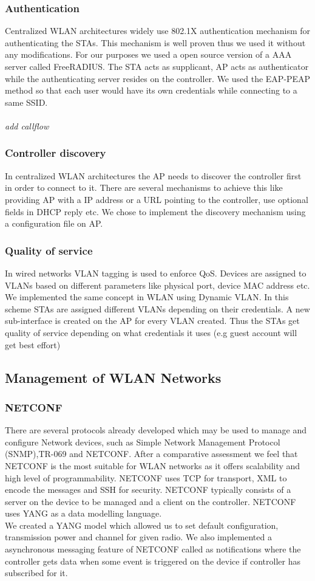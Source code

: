 \documentclass[12pt]{article}
\begin{document}
\subsubsection{Authentication}
Centralized WLAN architectures widely use 802.1X authentication mechanism for authenticating the STAs. This mechanism is well proven thus we used it without any modifications. For our purposes we used a open source version of a AAA server called FreeRADIUS. The STA acts as  supplicant, AP acts as authenticator while the authenticating server resides on the controller. We used the EAP-PEAP method so that each user would have its own credentials while connecting to a same SSID.\\
\\ \textit{add callflow}
\subsubsection{Controller discovery}
In centralized WLAN architectures the AP needs to discover the controller first in order to connect to it. There are several mechanisms to achieve this like providing AP with a IP address or a URL pointing to the controller, use optional fields in DHCP reply etc. We chose to implement the discovery mechanism using a configuration file on AP.
\subsubsection{Quality of service}
In wired networks VLAN tagging is used to enforce QoS. Devices are assigned to VLANs based on different parameters like physical port, device MAC address etc. We implemented the same concept in WLAN using Dynamic VLAN.  In this scheme STAs are assigned different VLANs depending on their credentials. A new sub-interface is created on the AP for every VLAN created. Thus the STAs get quality of service depending on what credentials it uses (e.g guest account will get best effort)


\subsection{Management of WLAN Networks}
   \subsubsection{NETCONF}
    There are several protocols already developed which may be used to manage and configure Network devices, such as Simple Network Management Protocol (SNMP),TR-069 and NETCONF. After a comparative assessment we feel that NETCONF is the most suitable for WLAN networks as it offers scalability and high level of programmability. NETCONF uses TCP for transport, XML to encode the messages and SSH for security. NETCONF typically consists of a server on the device to be managed and a client on the controller. NETCONF uses YANG\cite{RFC7950} as a data modelling language.\\
    We created a YANG model which allowed us to set default configuration, transmission power and channel for given radio. We also implemented a asynchronous messaging feature of NETCONF called as notifications where the controller gets data when some event is triggered on the device if controller has subscribed for it.
\end{document}
